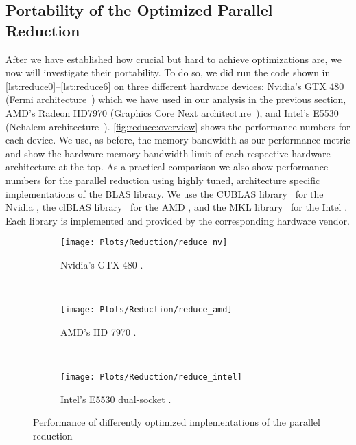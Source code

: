 \subsection{Portability of the Optimized Parallel Reduction}
After we have established how crucial but hard to achieve optimizations are, we now will investigate their portability.
To do so, we did run the code shown in \autoref{lst:reduce0}--\autoref{lst:reduce6} on three different hardware devices:
Nvidia's GTX 480 (Fermi \GPU architecture~\cite{CUDAFermi2009}) which we have used in our analysis in the previous section, AMD's Radeon HD7970 (Graphics Core Next \GPU architecture~\cite{AMDGCN2012}), and Intel's E5530 \CPU (Nehalem \CPU architecture~\cite{IntelNehalem2008}).
\autoref{fig:reduce:overview} shows the performance numbers for each device.
We use, as before, the memory bandwidth as our performance metric and show the hardware memory bandwidth limit of each respective hardware architecture at the top.
As a practical comparison we also show performance numbers for the parallel reduction using highly tuned, architecture specific implementations of the BLAS library.
We use the CUBLAS library~\cite{cuBLAS} for the Nvidia \GPU, the clBLAS library~\cite{clBLAS} for the AMD \GPU, and the MKL library~\cite{MKL} for the Intel \CPU.
Each library is implemented and provided by the corresponding hardware vendor.

\begin{figure}[p]
  \centering
\begin{subfigure}{\linewidth}
  \texttt{[image: Plots/Reduction/reduce\_nv]}
  \caption{Nvidia's GTX 480 \GPU.}
  \label{fig:reduce:nvidia}
\end{subfigure}\\
\begin{subfigure}{\linewidth}
  \texttt{[image: Plots/Reduction/reduce\_amd]}
  \caption{AMD's HD 7970 \GPU.}
  \label{fig:reduce:amd}
\end{subfigure}\\
\begin{subfigure}{\linewidth}
  \texttt{[image: Plots/Reduction/reduce\_intel]}
    \caption{Intel's E5530 dual-socket \CPU.}
  \label{fig:reduce:intel}
\end{subfigure}
  \caption[Performance of optimized implementations of the parallel reduction]{Performance of differently optimized implementations of the parallel reduction}
  \label{fig:reduce:overview}
\end{figure}


